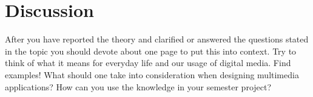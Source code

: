 \documentclass[11pt,a4paper,oneside,table,xcdraw]{article}
\begin{document}
	\section{Discussion}
	After you have reported the theory and clarified or answered the questions stated in
	the topic you should devote about one page to put this into context. Try to think of
	what it means for everyday life and our usage of digital media. Find examples! What
	should one take into consideration when designing multimedia applications? How can
	you use the knowledge in your semester project?
\fi


\end{document}
